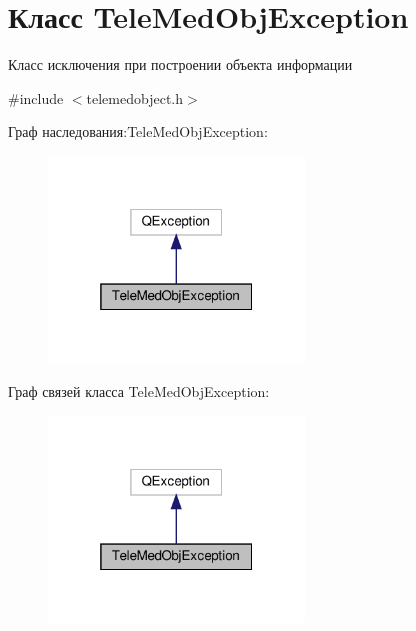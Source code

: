 \hypertarget{classTeleMedObjException}{}\section{Класс Tele\+Med\+Obj\+Exception}
\label{classTeleMedObjException}


Класс исключения при построении объекта информации  




{\ttfamily \#include $<$telemedobject.\+h$>$}



Граф наследования\+:Tele\+Med\+Obj\+Exception\+:\nopagebreak
\begin{figure}[H]
\begin{center}
\leavevmode
\includegraphics[width=193pt]{classTeleMedObjException__inherit__graph}
\end{center}
\end{figure}


Граф связей класса Tele\+Med\+Obj\+Exception\+:\nopagebreak
\begin{figure}[H]
\begin{center}
\leavevmode
\includegraphics[width=193pt]{classTeleMedObjException__coll__graph}
\end{center}
\end{figure}
